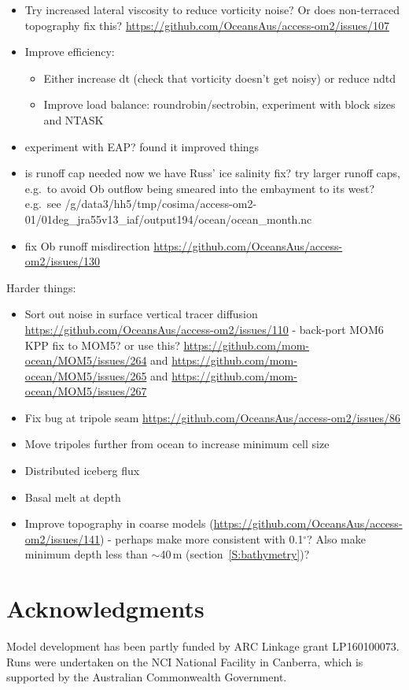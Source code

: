 \documentclass[11pt]{article}
\begin{document}
\begin{itemize}
\item Try increased lateral viscosity to reduce vorticity noise? Or does non-terraced topography fix this? \url{https://github.com/OceansAus/access-om2/issues/107}
\item Improve efficiency:
\begin{itemize}
\item Either increase dt (check that vorticity doesn't get noisy) or reduce ndtd
\item Improve load balance: roundrobin/sectrobin, experiment with block sizes and NTASK
\end{itemize}
\item experiment with EAP? \citet{Naughten2018a} found it improved things
\item is runoff cap needed now we have Russ' ice salinity fix? try larger runoff caps, e.g.\ to avoid Ob outflow being smeared into the embayment to its west? e.g.\ see /g/data3/hh5/tmp/cosima/access-om2-01/01deg_jra55v13_iaf/output194/ocean/ocean_month.nc
\item fix Ob runoff misdirection \url{https://github.com/OceansAus/access-om2/issues/130}
\end{itemize}

Harder things:
\begin{itemize}
\item Sort out noise in surface vertical tracer diffusion \url{https://github.com/OceansAus/access-om2/issues/110} - back-port MOM6 KPP fix to MOM5? or use this? \url{https://github.com/mom-ocean/MOM5/issues/264} and \url{https://github.com/mom-ocean/MOM5/issues/265} and \url{https://github.com/mom-ocean/MOM5/issues/267}
\item Fix bug at tripole seam \url{https://github.com/OceansAus/access-om2/issues/86}
\item Move tripoles further from ocean to increase minimum cell size
\item Distributed iceberg flux
\item Basal melt at depth
\item Improve topography in coarse models (\url{https://github.com/OceansAus/access-om2/issues/141}) - perhaps make more consistent with 0.1$^\circ$? Also make minimum depth less than $\sim$40\,m (section~\ref{S:bathymetry})?
\end{itemize}
 
 \newpage
 
 \section{Acknowledgments}
Model development has been partly funded by ARC Linkage grant LP160100073.
Runs were undertaken on the NCI National Facility in Canberra, which is supported by the Australian Commonwealth Government.
\end{document}
